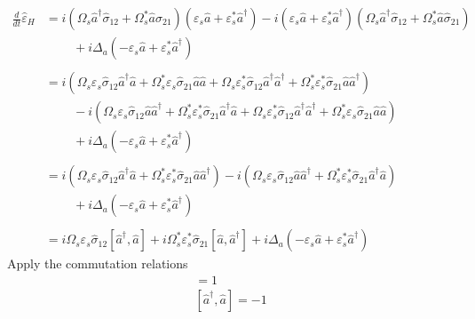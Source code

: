 \documentclass[aps,pra,showpacs,amsmath,amssymb,nofootinbib,longbibliography,superscriptaddress
]{revtex4-1}
\theoremstyle{definition}
\theoremstyle{remark}
\newcommand{\0}{\hat{0}}
\begin{document}
\begin{align}
    \frac{d}{dt}\hat{\varepsilon}_H
    &=
    i \left(\Omega_{s} \hat{a}^{\dagger} \hat{\sigma}_{12} + \Omega_{s}^* \hat{a} \hat{\sigma}_{21}\right) (\varepsilon_s \hat{a} + \varepsilon_s^* \hat{a}^{\dagger}) - i (\varepsilon_s \hat{a} + \varepsilon_s^* \hat{a}^{\dagger})
    \left(\Omega_{s} \hat{a}^{\dagger} \hat{\sigma}_{12} + \Omega_{s}^* \hat{a} \hat{\sigma}_{21}\right) \nonumber \\
    &\;\;\;\;\;\;\;\;+
    i \Delta_a \left(-\varepsilon_s \hat{a} + \varepsilon_s^* \hat{a}^{\dagger}\right)\nonumber \\\nonumber \\
    &=
    i \left(\Omega_{s} \varepsilon_s \hat{\sigma}_{12} \hat{a}^{\dagger} \hat{a} + \Omega_{s}^* \varepsilon_s \hat{\sigma}_{21} \hat{a}\hat{a} + \Omega_{s} \varepsilon_s^* \hat{\sigma}_{12} \hat{a}^{\dagger} \hat{a}^{\dagger} + \Omega_{s}^* \varepsilon_s^* \hat{\sigma}_{21} \hat{a}\hat{a}^{\dagger} \right) \nonumber\\
    &\;\;\;\;\;\;\;\;-
    i \left(\Omega_{s} \varepsilon_s \hat{\sigma}_{12}\hat{a} \hat{a}^{\dagger} + \Omega_{s}^* \varepsilon_s^* \hat{\sigma}_{21} \hat{a}^{\dagger} \hat{a} + \Omega_{s} \varepsilon_s^* \hat{\sigma}_{12}\hat{a}^{\dagger} \hat{a}^{\dagger} + \Omega_{s}^* \varepsilon_s \hat{\sigma}_{21} \hat{a} \hat{a} \right) \nonumber \\
    &\;\;\;\;\;\;\;\;+
    i \Delta_a \left(-\varepsilon_s \hat{a} + \varepsilon_s^* \hat{a}^{\dagger}\right)\nonumber \\\nonumber \\
    &=
    i \left(\Omega_{s} \varepsilon_s \hat{\sigma}_{12} \hat{a}^{\dagger} \hat{a} + \Omega_{s}^* \varepsilon_s^* \hat{\sigma}_{21} \hat{a}\hat{a}^{\dagger} \right) -
    i \left(\Omega_{s} \varepsilon_s \hat{\sigma}_{12}\hat{a} \hat{a}^{\dagger} + \Omega_{s}^* \varepsilon_s^* \hat{\sigma}_{21} \hat{a}^{\dagger} \hat{a}\right) \nonumber \\
    &\;\;\;\;\;\;\;\;+
    i \Delta_a \left(-\varepsilon_s \hat{a} + \varepsilon_s^* \hat{a}^{\dagger}\right)\nonumber \\\nonumber \\
    &=
    i \Omega_{s} \varepsilon_s \hat{\sigma}_{12} [\hat{a}^{\dagger}, \hat{a}] + i \Omega_{s}^* \varepsilon_s^* \hat{\sigma}_{21} [\hat{a}, \hat{a}^{\dagger}] +
    i \Delta_a \left(-\varepsilon_s \hat{a} + \varepsilon_s^* \hat{a}^{\dagger}\right)
\end{align}
Apply the commutation relations
\begin{align}
    [\hat{a}, \hat{a}^{\dagger}] = 1\\
    [\hat{a}^{\dagger}, \hat{a}] = -1
\end{align}
\end{document}
